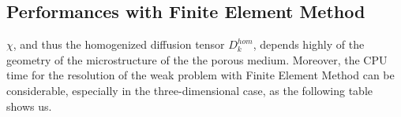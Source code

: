 \subsection{Performances with Finite Element Method}

$\chi$, and thus the homogenized diffusion tensor $D_k^{hom}$, depends highly of the geometry of the microstructure of the the porous medium. %
Moreover, the CPU time for the resolution of the weak problem with Finite Element Method can be considerable, especially in the three-dimensional case, %
as the following table shows us.



















